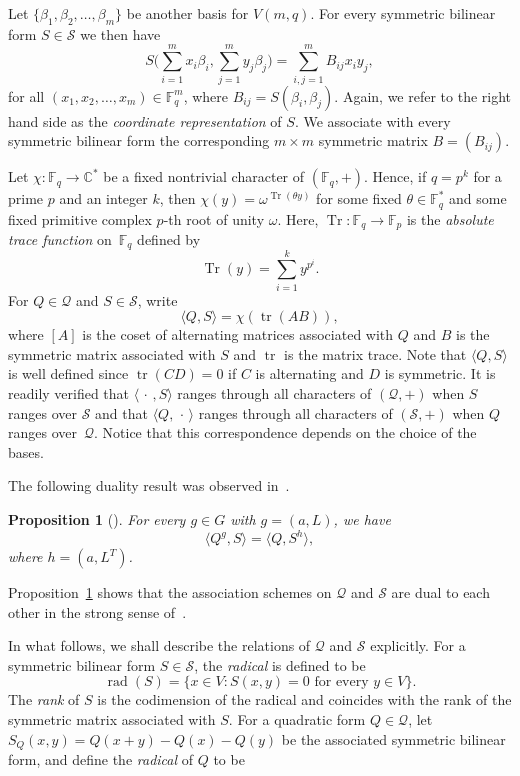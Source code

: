 \documentclass[10pt]{article}
\newtheorem{prop}[theorem]{Proposition}
\theoremstyle{definition}
\newcommand{\CC}{\mathbb{C}}
\newcommand{\FF}{\mathbb{F}}
\newcommand{\Q}{\mathscr{Q}}
\renewcommand{\S}{\mathscr{S}}
\newcommand{\ang}[1]{\langle#1\rangle}
\DeclareMathOperator{\rad}{rad}
\DeclareMathOperator{\tr}{tr}
\DeclareMathOperator{\Tr}{Tr}
\begin{document}
\par
Let $\{\beta_1,\beta_2,\dots,\beta_m\}$ be another basis for $V(m,q)$. For every symmetric bilinear form $S\in\S$ we then have
\[
S\bigg(\sum_{i=1}^mx_i\beta_i,\sum_{j=1}^my_j\beta_j\bigg)=\sum_{i,j=1}^mB_{ij}x_iy_j,
\]
for all $(x_1,x_2,\dots,x_m)\in\FF_q^m$, where $B_{ij}=S(\beta_i,\beta_j)$. Again, we refer to the right hand side as the \emph{coordinate representation} of $S$. We associate with every symmetric bilinear form the corresponding $m\times m$ symmetric matrix $B=(B_{ij})$.
\par
Let $\chi:\FF_q\to\CC^*$ be a fixed nontrivial character of $(\FF_q,+)$. Hence, if $q=p^k$ for a prime $p$ and an integer $k$, then $\chi(y)=\omega^{\Tr(\theta y)}$ for some fixed $\theta\in\FF_q^*$ and some fixed primitive complex $p$-th root of unity $\omega$. Here, $\Tr:\FF_q\to\FF_p$ is the \emph{absolute trace function} on~$\FF_q$ defined by
\[
\Tr(y)=\sum_{i=1}^ky^{p^i}.
\]
For $Q\in\Q$ and $S\in\S$, write
\begin{equation}
\ang{Q,S}=\chi(\tr(AB)),   \label{eqn:inner_product}
\end{equation}
where $[A]$ is the coset of alternating matrices associated with $Q$ and $B$ is the symmetric matrix associated with $S$ and $\tr$ is the matrix trace. Note that $\ang{Q,S}$ is well defined since $\tr(CD)=0$ if $C$ is alternating and $D$ is symmetric. It is readily verified that $\ang{\,\cdot\,,S}$ ranges through all characters of $(\Q,+)$ when $S$ ranges over $\S$ and that $\ang{Q,\,\cdot\,}$ ranges through all characters of $(\S,+)$ when $Q$ ranges over~$\Q$. Notice that this correspondence depends on the choice of the bases.
\par
The following duality result was observed in~\cite{WanWanMaMa2003}.
\enlargethispage{1.3ex}
\begin{prop}[{\cite[Proposition~3.2]{WanWanMaMa2003}}]
\label{pro:duality}
For every $g\in G$ with $g=(a,L)$, we have
\[
\ang{Q^g,S}=\ang{Q,S^h},
\]
where $h=(a,L^T)$.
\end{prop}
\par
Proposition~\ref{pro:duality} shows that the association schemes on $\Q$ and $\S$ are dual to each other in the strong sense of~\cite[Definition~11]{DelLev1998}.
\par
In what follows, we shall describe the relations of $\Q$ and $\S$ explicitly. For a symmetric bilinear form $S\in\S$, the \emph{radical} is defined to be 
\[
\rad(S)=\{x\in V:\text{$S(x,y)=0$ for every $y\in V$}\}.
\]
The \emph{rank} of $S$ is the codimension of the radical and coincides with the rank of the symmetric matrix associated with $S$. For a quadratic form $Q\in\Q$, let $S_Q(x,y)=Q(x+y)-Q(x)-Q(y)$ be the associated symmetric bilinear form, and define the \emph{radical} of $Q$ to be 
\end{document}
